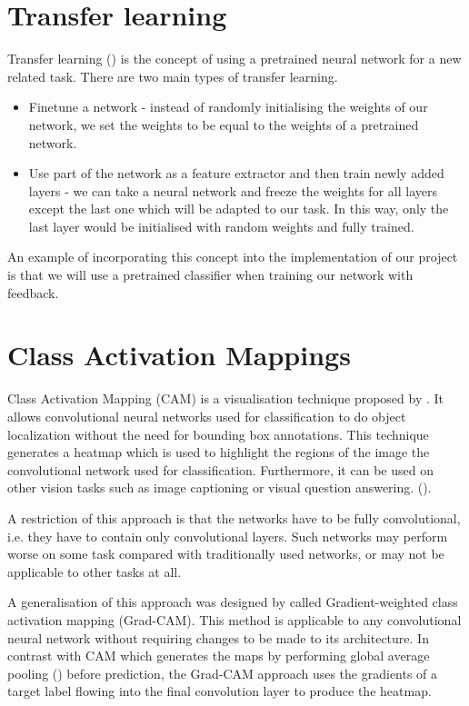 \documentclass{l4proj}
\begin{document}
\section{Transfer learning}
Transfer learning (\cite{transfer}) is the concept of using a pretrained neural network for a new related task. There are two main types of transfer learning.
\begin{itemize}
    \item Finetune a network - instead of randomly initialising the weights of our network, we set the weights to be equal to the weights of a pretrained network. 
    \item Use part of the network as a feature extractor and then train newly added layers - we can take a neural network and freeze the weights for all layers except the last one which will be adapted to our task. In this way, only the last layer would be initialised with random weights and fully trained.
\end{itemize}
An example of incorporating this concept into the implementation of our project is that we will use a pretrained classifier when training our network with feedback.

\section{Class Activation Mappings}
\label{lab:gradcam}
Class Activation Mapping (CAM) is a visualisation technique proposed by \cite{cam}. It allows convolutional neural networks used for classification to do object localization without the need for bounding box annotations. This technique generates a heatmap which is used to highlight the regions of the image the convolutional network used for classification. Furthermore, it can be used on other vision tasks such as image captioning or visual question answering. (\cite{VQA}). 

A restriction of this approach is that the networks have to be fully convolutional, i.e. they have to contain only convolutional layers. Such networks may perform worse on some task compared with traditionally used networks, or may not be applicable to other tasks at all.

A generalisation of this approach was designed by \cite{gradcam} called Gradient-weighted class activation mapping (Grad-CAM). This method is applicable to any convolutional neural network without requiring changes to be made to its architecture. In contrast with CAM which generates the maps by performing global average pooling (\cite{gap}) before prediction, the Grad-CAM approach uses the gradients of a target label flowing into the final convolution layer to produce the heatmap.
\end{document}
